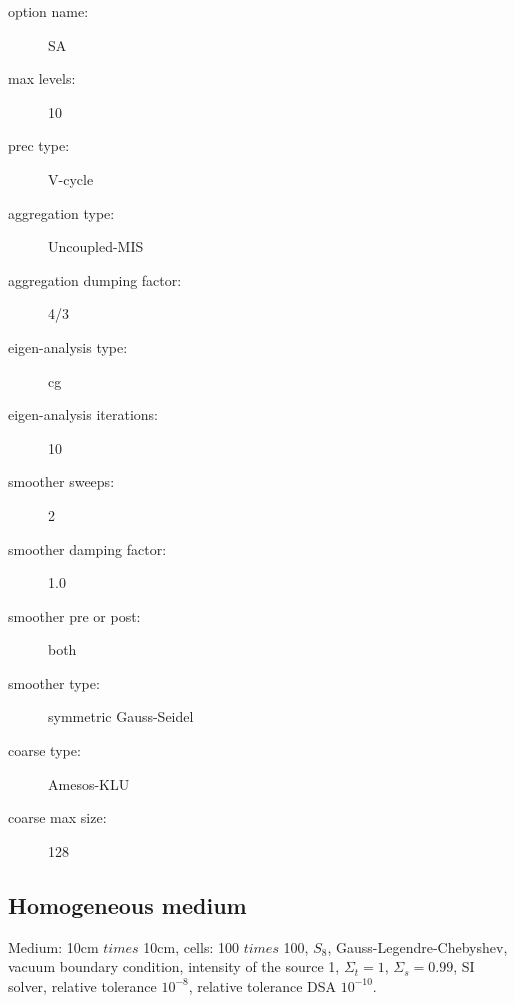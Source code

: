\begin{description}
\item [option name:] SA
\item [max levels:] 10
\item [prec type:] V-cycle
\item [aggregation type:] Uncoupled-MIS
\item [aggregation dumping factor:] 4/3
\item [eigen-analysis type:] cg
\item [eigen-analysis iterations:] 10
\item [smoother sweeps:] 2
\item [smoother damping factor:] 1.0
\item [smoother pre or post:] both
\item [smoother type:] symmetric Gauss-Seidel
\item [coarse type:] Amesos-KLU
\item [coarse max size:] 128
\end{description}

\subsection{Homogeneous medium}
Medium: 10cm $times$ 10cm, cells: 100 $times$ 100, $S_8$,
Gauss-Legendre-Chebyshev, vacuum boundary condition, intensity of the source
1, $\Sigma_t =1$, $\Sigma_s=0.99$, SI solver, relative tolerance $10^{-8}$,
relative tolerance DSA $10^{-10}$.
